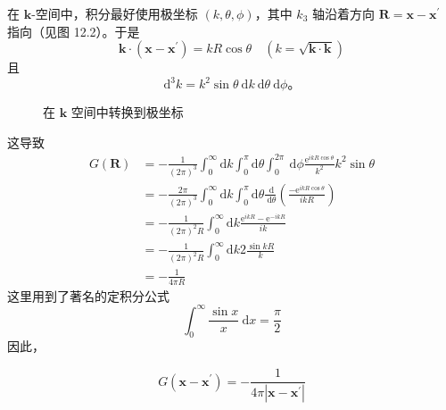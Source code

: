 在 $\mathbf{k}$-空间中，积分最好使用极坐标 $(k, \theta, \phi)$，其中
$k_{3}$ 轴沿着方向 $\mathbf{R}=\mathbf{x}-\mathbf{x}^{\prime}$
指向（见图 12.2）。于是
 $$
\mathbf{k} \cdot\left(\mathbf{x}-\mathbf{x}^{\prime}\right)=k R \cos \theta \quad(k=\sqrt{\mathbf{k} \cdot \mathbf{k}})
$$
且
 $$
\mathrm{d}^{3} k=k^{2} \sin \theta \mathrm{~d} k \mathrm{~d} \theta \mathrm{~d} \phi。
$$
\begin{figure}
  \centering
  \caption{在 $\mathbf{k}$ 空间中转换到极坐标}
  \label{12.2}
\end{figure}


这导致
 $$
\begin{aligned}
G(\mathbf{R}) & =-\frac{1}{(2 \pi)^{3}} \int_{0}^{\infty} \mathrm{d} k \int_{0}^{\pi} \mathrm{d} \theta \int_{0}^{2 \pi} \mathrm{~d} \phi \frac{\mathrm{e}^{i k R \cos \theta}}{k^{2}} k^{2} \sin \theta \\
& =-\frac{2 \pi}{(2 \pi)^{3}} \int_{0}^{\infty} \mathrm{d} k \int_{0}^{\pi} \mathrm{d} \theta \frac{\mathrm{~d}}{\mathrm{~d} \theta}\left(\frac{-\mathrm{e}^{i k R \cos \theta}}{i k R}\right) \\
& =-\frac{1}{(2 \pi)^{2} R} \int_{0}^{\infty} \mathrm{d} k \frac{\mathrm{e}^{i k R}-\mathrm{e}^{-i k R}}{i k} \\
& =-\frac{1}{(2 \pi)^{2} R} \int_{0}^{\infty} \mathrm{d} k 2 \frac{\sin k R}{k} \\
& =-\frac{1}{4 \pi R}
\end{aligned}
$$
这里用到了著名的定积分公式
 $$
\int_{0}^{\infty} \frac{\sin x}{x} \mathrm{~d} x=\frac{\pi}{2}
$$
因此，

\begin{equation}\label{eq:12.18} 
 G\left(\mathbf{x}-\mathbf{x}^{\prime}\right)=-\frac{1}{4 \pi\left|\mathbf{x}-\mathbf{x}^{\prime}\right|} 
 \end{equation}

